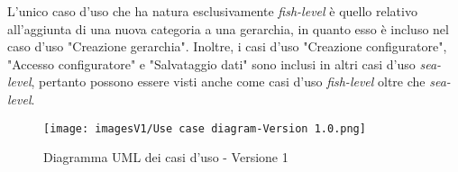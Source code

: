 L'unico caso d'uso che ha natura esclusivamente \textit{fish-level} è quello relativo all'aggiunta di una nuova categoria a una gerarchia, in quanto esso è incluso nel caso d'uso "Creazione gerarchia". Inoltre, i casi d'uso "Creazione configuratore", "Accesso configuratore" e "Salvataggio dati" sono inclusi in altri casi d'uso \textit{sea-level}, pertanto possono essere visti anche come casi d'uso \textit{fish-level} oltre che \textit{sea-level}.

\begin{figure}
\centering
\texttt{[image: imagesV1/Use case diagram-Version 1.0.png]}
\caption{\label{fig:Use Case 1}Diagramma UML dei casi d'uso - Versione 1}
\end{figure}\bigskip